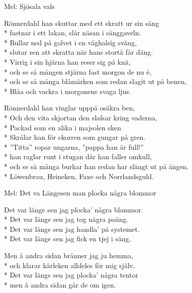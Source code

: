\begin{SongText}[Rönnerdahl]
    \begin{SongInfo}
        Mel: Sjösala vals
    \end{SongInfo}
    \begin{SongVerse}
        Rönnerdahl han skuttar med ett skratt ur sin säng\\*%
        fastnar i ett lakan, slår näsan i sänggaveln.\\*%
        Rullar ned på golvet i en våghalsig sväng,\\*%
        slutar sen att skratta när hans stortå får däng.\\*%
        Virrig i sin hjärna han reser sig på knä,\\*%
        och se så mången stjärna fast morgon de nu é,\\*%
        och se så många blåmärken som redan slagit ut på benen,\\*%
        Blåa och vackra i morgonens svaga ljus.
    \end{SongVerse}
    \begin{SongVerse}
        Rönnerdahl han vinglar upppå osäkra ben,\\*%
        Och den vita skjortan den slafsar kring vaderna,\\*%
        Packad som en alika i majsolen sken\\*%
        Skrålar han för ekorren som gungar på gren.\\*%
        ”Titta” ropar ungarna, ”pappa han är full!”\\*%
        han raglar runt i stugan där han faller omkull,\\*%
        och se så många burkar han redan har slängt ut på ängen.\\*%
        Löwenbrau, Heineken, Faxe och Norrlandsguld.
    \end{SongVerse}
\end{SongText}
\begin{SongText}
    \begin{SongInfo}
        Mel: Det va Längesen man plocka några blommor
    \end{SongInfo}
    \begin{SongVerse}
        Det var länge sen jag plocka’ några blommor.\\*%
        Det var länge sen jag tog några poäng.\\*%
        Det var länge sen jag handla’ på systemet.\\*%
        Det var länge sen jag fick en tjej i säng.
    \end{SongVerse}
    \begin{SongVerse}
        Men å andra sidan bränner jag ju hemma,\\*%
        och klarar kärleken alldeles för mig själv.\\*%
        Det var länge sen jag plocka’ några tentor\\*%
        men å andra sidan går de om igen.
    \end{SongVerse}
\end{SongText}
